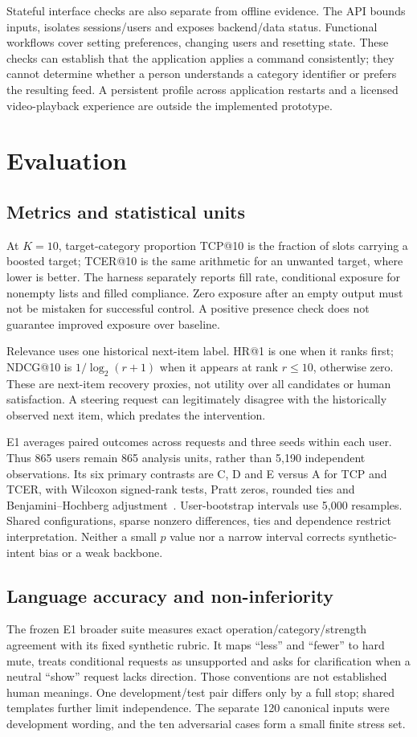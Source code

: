 \documentclass[conference]{IEEEtran}
\begin{document}
Stateful interface checks are also separate from offline evidence. The API bounds inputs, isolates sessions/users and exposes backend/data status. Functional workflows cover setting preferences, changing users and resetting state. These checks can establish that the application applies a command consistently; they cannot determine whether a person understands a category identifier or prefers the resulting feed. A persistent profile across application restarts and a licensed video-playback experience are outside the implemented prototype.

\section{Evaluation}
\subsection{Metrics and statistical units}
At $K=10$, target-category proportion TCP@10 is the fraction of slots carrying a boosted target; TCER@10 is the same arithmetic for an unwanted target, where lower is better. The harness separately reports fill rate, conditional exposure for nonempty lists and filled compliance. Zero exposure after an empty output must not be mistaken for successful control. A positive presence check does not guarantee improved exposure over baseline.

Relevance uses one historical next-item label. HR@1 is one when it ranks first; NDCG@10 is $1/\log_2(r+1)$ when it appears at rank $r\leq10$, otherwise zero. These are next-item recovery proxies, not utility over all candidates or human satisfaction. A steering request can legitimately disagree with the historically observed next item, which predates the intervention.

E1 averages paired outcomes across requests and three seeds within each user. Thus 865 users remain 865 analysis units, rather than 5,190 independent observations. Its six primary contrasts are C, D and E versus A for TCP and TCER, with Wilcoxon signed-rank tests, Pratt zeros, rounded ties and Benjamini--Hochberg adjustment~\cite{scipywilcoxon,scipyfdr}. User-bootstrap intervals use 5,000 resamples. Shared configurations, sparse nonzero differences, ties and dependence restrict interpretation. Neither a small $p$ value nor a narrow interval corrects synthetic-intent bias or a weak backbone.

\subsection{Language accuracy and non-inferiority}
The frozen E1 broader suite measures exact operation/category/strength agreement with its fixed synthetic rubric. It maps ``less'' and ``fewer'' to hard mute, treats conditional requests as unsupported and asks for clarification when a neutral ``show'' request lacks direction. Those conventions are not established human meanings. One development/test pair differs only by a full stop; shared templates further limit independence. The separate 120 canonical inputs were development wording, and the ten adversarial cases form a small finite stress set.
\end{document}
